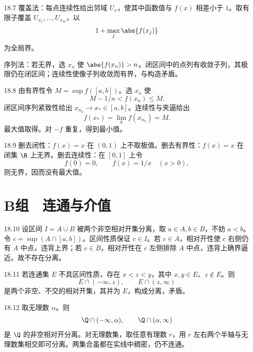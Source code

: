 \begin{solution}{18.7}
覆盖法：每点连续性给出邻域 \(U_x\)，使其中函数值与 \(f(x)\) 相差小于 \(1\)。取有限子覆盖 \(U_{x_1},\ldots,U_{x_m}\)，以
\[
 1+\max_j\abs{f(x_j)}
\]
为全局界。

序列法：若无界，选 \(x_n\) 使 \(\abs{f(x_n)}>n\)。闭区间中的点列有收敛子列，其极限仍在闭区间；连续性使像子列收敛而有界，与构造矛盾。
\end{solution}

\begin{solution}{18.8}
由有界性令 \(M=\sup f([a,b])\)。选 \(x_n\) 使
\[
 M-1/n<f(x_n)\le M.
\]
闭区间序列紧致性给出 \(x_{n_k}\to x_*\in[a,b]\)。连续性与夹逼给出
\[
 f(x_*)=\lim_k f(x_{n_k})=M.
\]
最大值取得。对 \(-f\) 重复，得到最小值。
\end{solution}

\begin{solution}{18.9}
删去闭性：\(f(x)=x\) 在 \((0,1)\) 上不取极值。删去有界性：\(f(x)=x\) 在闭集 \(\R\) 上无界。删去连续性：在 \([0,1]\) 上令
\[
 f(0)=0,\qquad f(x)=1/x\quad(x>0),
\]
则无界，因而没有最大值。
\end{solution}

\section*{B组　连通与介值}

\begin{solution}{18.10}
设区间 \(I=A\cup B\) 被两个非空相对开集分离，取 \(a\in A,b\in B\)，不妨 \(a<b\)。令 \(c=\sup(A\cap[a,b])\)。区间性质保证 \(c\in I\)。若 \(c\in A\)，相对开性使 \(c\) 右侧仍有 \(A\) 中点，违背上界；若 \(c\in B\)，相对开性在 \(c\) 左侧排除 \(A\) 中点，违背上确界逼近。故不存在分离。
\end{solution}

\begin{solution}{18.11}
若连通集 \(E\) 不具区间性质，存在 \(x<z<y\)，其中 \(x,y\in E\)、\(z\notin E\)。则
\[
 E\cap(-\infty,z),\qquad E\cap(z,\infty)
\]
是两个非空、不交的相对开集，其并为 \(E\)，构成分离，矛盾。
\end{solution}

\begin{solution}{18.12}
取无理数 \(\alpha\)。则
\[
 \Q\cap(-\infty,\alpha),\qquad \Q\cap(\alpha,\infty)
\]
是 \(\Q\) 的非空相对开分离。对无理数集，取任意有理数 \(r\)，用 \(r\) 左右两个半轴与无理数集相交即可分离。两集合虽都在实线中稠密，仍不连通。
\end{solution}

